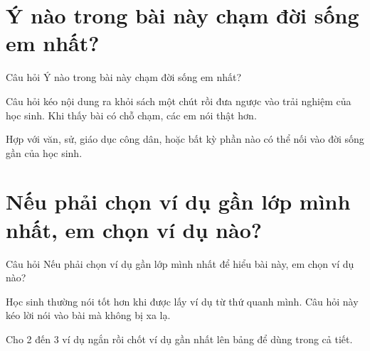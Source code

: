 \section{Ý nào trong bài này chạm đời sống em nhất?}
\begin{cauhoibox}{Câu hỏi}
Ý nào trong bài này chạm đời sống em nhất?
\end{cauhoibox}
\begin{taisaocoich}
Câu hỏi kéo nội dung ra khỏi sách một chút rồi đưa ngược vào trải nghiệm của học sinh. Khi thấy bài có chỗ chạm, các em nói thật hơn.
\end{taisaocoich}
\begin{goiybien}
Hợp với văn, sử, giáo dục công dân, hoặc bất kỳ phần nào có thể nối vào đời sống gần của học sinh.
\end{goiybien}
\ngancach

\section{Nếu phải chọn ví dụ gần lớp mình nhất, em chọn ví dụ nào?}
\begin{cauhoibox}{Câu hỏi}
Nếu phải chọn ví dụ gần lớp mình nhất để hiểu bài này, em chọn ví dụ nào?
\end{cauhoibox}
\begin{taisaocoich}
Học sinh thường nói tốt hơn khi được lấy ví dụ từ thứ quanh mình. Câu hỏi này kéo lời nói vào bài mà không bị xa lạ.
\end{taisaocoich}
\begin{goiybien}
Cho 2 đến 3 ví dụ ngắn rồi chốt ví dụ gần nhất lên bảng để dùng trong cả tiết.
\end{goiybien}
